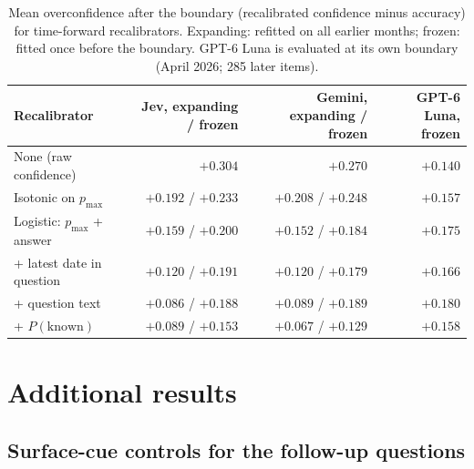 \documentclass[10pt,twocolumn]{article}
\newcommand{\pmax}{p_{\max}}
\begin{document}
\begin{table}[h]
\centering\small
\caption{Mean overconfidence after the boundary (recalibrated confidence
minus accuracy) for time-forward recalibrators. Expanding: refitted on all
earlier months; frozen: fitted once before the boundary. GPT-6 Luna is
evaluated at its own boundary (April 2026; 285 later items).}
\label{tab:forward}
\begin{tabular}{@{}l r r r@{}}
\toprule
Recalibrator & Jev, expanding / frozen & Gemini, expanding / frozen & GPT-6 Luna, frozen \\
\midrule
None (raw confidence) & $+0.304$ & $+0.270$ & $+0.140$ \\
Isotonic on $\pmax$ & $+0.192$ / $+0.233$ & $+0.208$ / $+0.248$ & $+0.157$ \\
Logistic: $\pmax$ + answer & $+0.159$ / $+0.200$ & $+0.152$ / $+0.184$ & $+0.175$ \\
\quad + latest date in question & $+0.120$ / $+0.191$ & $+0.120$ / $+0.179$ & $+0.166$ \\
\quad + question text & $+0.086$ / $+0.188$ & $+0.089$ / $+0.189$ & $+0.180$ \\
\quad + $P(\text{known})$ & $+0.089$ / $+0.153$ & $+0.067$ / $+0.129$ & $+0.158$ \\
\bottomrule
\end{tabular}
\end{table}

\section{Additional results}
\label{app:more}

\subsection{Surface-cue controls for the follow-up questions}
\label{app:cues}
\end{document}
